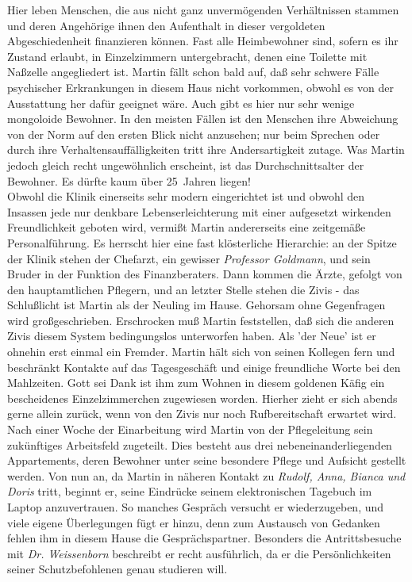 Hier leben Menschen, die aus nicht ganz unverm\"ogenden Verh\"altnissen
stammen und deren Angeh\"orige ihnen den Aufenthalt in dieser vergoldeten
Abgeschiedenheit finanzieren k\"onnen. Fast alle Heimbewohner sind, sofern
es ihr Zustand erlaubt, in Einzelzimmern untergebracht, denen eine Toilette
mit Na{\ss}zelle angegliedert ist. Martin f\"allt schon bald auf, da{\ss}
sehr schwere F\"alle psychischer Erkrankungen in diesem Haus nicht vorkommen,
obwohl es von der Ausstattung her daf\"ur geeignet w\"are. Auch gibt es
hier nur sehr wenige mongoloide Bewohner. In den meisten F\"allen ist den
Menschen ihre Abweichung von der Norm auf den ersten Blick nicht anzusehen;
nur beim Sprechen oder durch ihre Verhaltensauff\"alligkeiten tritt ihre
Andersartigkeit zutage. Was Martin jedoch gleich recht ungew\"ohnlich
erscheint, ist das Durchschnittsalter der Bewohner. Es d\"urfte kaum \"uber
25~Jahren liegen! \\
Obwohl die Klinik einerseits sehr modern eingerichtet ist und obwohl den
Insassen jede nur denkbare Lebenserleichterung mit einer aufgesetzt
wirkenden Freundlichkeit geboten wird, vermi{\ss}t Martin andererseits eine
zeitgem\"a{\ss}e Personalf\"uhrung. Es herrscht hier eine fast kl\"osterliche
Hierarchie: an der Spitze der Klinik stehen der Chefarzt, ein gewisser
{\em Professor Goldmann\/}, und sein Bruder in der Funktion des Finanzberaters.
Dann kommen die \"Arzte, gefolgt von den hauptamtlichen Pflegern, und an
letzter Stelle stehen die Zivis - das Schlu{\ss}licht ist Martin als der
Neuling im Hause. Gehorsam ohne Gegenfragen wird gro{\ss}geschrieben.
Erschrocken mu{\ss} Martin feststellen, da{\ss} sich die anderen Zivis diesem
System bedingungslos unterworfen haben. Als 'der Neue' ist er ohnehin erst
einmal ein Fremder. Martin h\"alt sich von seinen Kollegen fern und
beschr\"ankt Kontakte auf das Tagesgesch\"aft und einige freundliche Worte bei
den Mahlzeiten. Gott sei Dank ist ihm zum Wohnen in diesem goldenen K\"afig ein
bescheidenes Einzelzimmerchen zugewiesen worden. Hierher zieht er sich abends
gerne allein zur\"uck, wenn von den Zivis nur noch Rufbereitschaft erwartet
wird. \\

\newpage\noindent %
Nach einer Woche der Einarbeitung wird Martin von der Pflegeleitung sein
zuk\"unftiges Arbeitsfeld zugeteilt. Dies besteht aus drei
nebeneinanderliegenden Appartements, deren Bewohner unter seine besondere
Pflege und Aufsicht gestellt werden. Von nun an, da Martin in n\"aheren Kontakt
zu {\em Rudolf, Anna, Bianca und Doris\/} tritt, beginnt er, seine Eindr\"ucke
seinem elektronischen Tagebuch im Laptop anzuvertrauen. So manches Gespr\"ach
versucht er wiederzugeben, und viele eigene \"Uberlegungen f\"ugt er
hinzu, denn zum Austausch von Gedanken fehlen ihm in diesem Hause die
Gespr\"achspartner. Besonders die Antrittsbesuche mit {\em Dr. Weissenborn\/}
beschreibt er recht ausf\"uhrlich, da er die Pers\"onlichkeiten seiner
Schutzbefohlenen genau studieren will. 